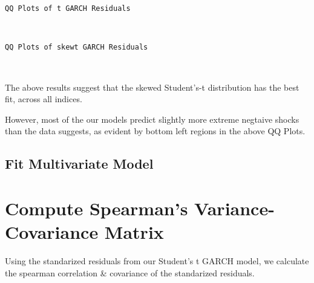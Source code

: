 \documentclass[11pt]{article}
\begin{document}
    \begin{Verbatim}[commandchars=\\\{\}]
QQ Plots of t GARCH Residuals
    \end{Verbatim}

    \begin{center}
    \end{center}
    { \hspace*{\fill} \\}
    
    \begin{Verbatim}[commandchars=\\\{\}]
QQ Plots of skewt GARCH Residuals
    \end{Verbatim}

    \begin{center}
    \end{center}
    { \hspace*{\fill} \\}
    
    The above results suggest that the skewed Student's-t distribution has
the best fit, across all indices.

However, most of the our models predict slightly more extreme negtaive
shocks than the data suggests, as evident by bottom left regions in the
above QQ Plots.

    \subsection{Fit Multivariate Model}\label{fit-multivariate-model}

    \section{Compute Spearman's Variance-Covariance
Matrix}\label{compute-spearmans-variance-covariance-matrix}

Using the standarized residuals from our Student's t GARCH model, we
calculate the spearman correlation \& covariance of the standarized
residuals.
\end{document}
